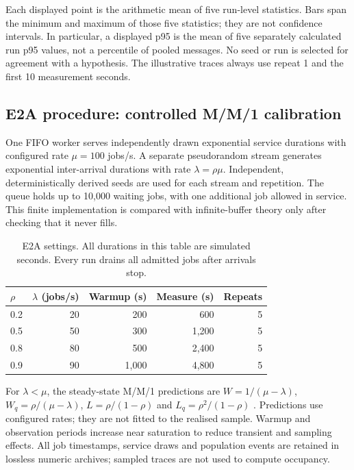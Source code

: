 Each displayed point is the arithmetic mean of five run-level statistics. Bars span the minimum and maximum of those five statistics; they are not confidence intervals. In particular, a displayed p95 is the mean of five separately calculated run p95 values, not a percentile of pooled messages. No seed or run is selected for agreement with a hypothesis. The illustrative traces always use repeat 1 and the first 10 measurement seconds.

\subsection{E2A procedure: controlled M/M/1 calibration}

One FIFO worker serves independently drawn exponential service durations with configured rate $\mu=100$ jobs/s. A separate pseudorandom stream generates exponential inter-arrival durations with rate $\lambda=\rho\mu$. Independent, deterministically derived seeds are used for each stream and repetition. The queue holds up to 10,000 waiting jobs, with one additional job allowed in service. This finite implementation is compared with infinite-buffer theory only after checking that it never fills.

\begin{table}[H]\centering
\small
\setlength{\tabcolsep}{5pt}
\begin{tabular}{lrrrr}
\hline
$\rho$ & $\lambda$ (jobs/s) & Warmup (s) & Measure (s) & Repeats \\
\hline
0.2 & 20 & 200 & 600 & 5 \\
0.5 & 50 & 300 & 1,200 & 5 \\
0.8 & 80 & 500 & 2,400 & 5 \\
0.9 & 90 & 1,000 & 4,800 & 5 \\
\hline
\end{tabular}
\caption{E2A settings. All durations in this table are simulated seconds. Every run drains all admitted jobs after arrivals stop.}
\label{tab:model_protocol}
\end{table}

For $\lambda<\mu$, the steady-state M/M/1 predictions are $W=1/(\mu-\lambda)$, $W_q=\rho/(\mu-\lambda)$, $L=\rho/(1-\rho)$ and $L_q=\rho^2/(1-\rho)$ \cite{mitqueue}. Predictions use configured rates; they are not fitted to the realised sample. Warmup and observation periods increase near saturation to reduce transient and sampling effects. All job timestamps, service draws and population events are retained in lossless numeric archives; sampled traces are not used to compute occupancy.

